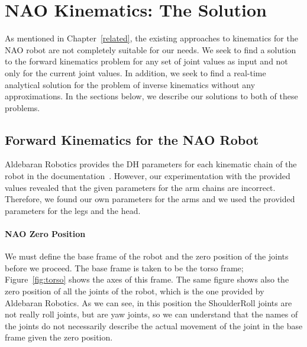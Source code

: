 \chapter{NAO Kinematics: The Solution}
\label{approach}

As mentioned in Chapter~\ref{related}, the existing approaches to kinematics for the NAO robot are not completely suitable for our needs. We seek to find a solution to the forward kinematics problem for any set of joint values as input and not only for the current joint values. In addition, we seek to find a real-time analytical solution for the problem of inverse kinematics without any approximations. In the sections below, we describe our solutions to both of these problems.


\section{Forward Kinematics for the NAO Robot}


Aldebaran Robotics provides the DH parameters for each kinematic chain of the robot in the documentation~\cite{AldebaranNaoDoc}. However, our experimentation with the provided values revealed that the given parameters for the arm chains are incorrect. Therefore, we found our own parameters for the arms and we used the provided parameters for the legs and the head.


\subsubsection*{NAO Zero Position}
We must define the base frame of the robot and the zero position of the joints before we proceed. The base frame is taken to be the torso frame; Figure~\ref{fig:torso} shows the axes of this frame. The same figure shows also the zero position of all the joints of the robot, which is the one provided by Aldebaran Robotics. As we can see, in this position the ShoulderRoll joints are not really roll joints, but are yaw joints, so we can understand that the names of the joints do not necessarily describe the actual movement of the joint in the base frame given the zero position.


